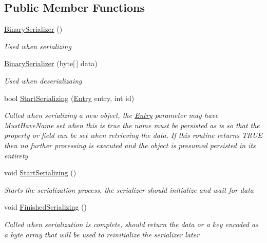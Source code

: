\subsection*{Public Member Functions}
\begin{DoxyCompactItemize}
\item 
\hyperlink{class_serialization_1_1_binary_serializer_ae554963a22e35f96cd09c44b33a8370f}{Binary\+Serializer} ()
\begin{DoxyCompactList}\small\item\em Used when serializing \end{DoxyCompactList}\item 
\hyperlink{class_serialization_1_1_binary_serializer_a28b39ec2276e718a01c09401054e9160}{Binary\+Serializer} (byte\mbox{[}$\,$\mbox{]} data)
\begin{DoxyCompactList}\small\item\em Used when deserializaing \end{DoxyCompactList}\item 
bool \hyperlink{class_serialization_1_1_binary_serializer_aef0fdf4b432dfe09b1bf9c11786dee58}{Start\+Serializing} (\hyperlink{class_serialization_1_1_entry}{Entry} entry, int id)
\begin{DoxyCompactList}\small\item\em Called when serializing a new object, the \hyperlink{class_serialization_1_1_entry}{Entry} parameter may have Must\+Have\+Name set when this is true the name must be persisted as is so that the property or field can be set when retrieving the data. If this routine returns T\+R\+UE then no further processing is executed and the object is presumed persisted in its entirety \end{DoxyCompactList}\item 
void \hyperlink{class_serialization_1_1_binary_serializer_a7266eb0f6366fe0d40bbcb9d4434f262}{Start\+Serializing} ()
\begin{DoxyCompactList}\small\item\em Starts the serialization process, the serializer should initialize and wait for data \end{DoxyCompactList}\item 
void \hyperlink{class_serialization_1_1_binary_serializer_a33f7f74fffe31b07a96ab08fa545e990}{Finished\+Serializing} ()
\begin{DoxyCompactList}\small\item\em Called when serialization is complete, should return the data or a key encoded as a byte array that will be used to reinitialize the serializer later \end{DoxyCompactList}\item 

\end{DoxyCompactItemize}
